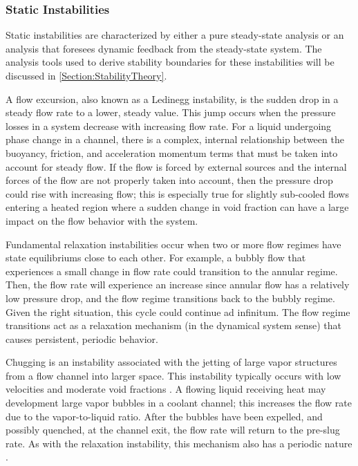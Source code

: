 \subsubsection{Static Instabilities}
Static instabilities are characterized by either a pure steady-state analysis or an analysis that foresees dynamic feedback from the steady-state system.
The analysis tools used to derive stability boundaries for these instabilities will be discussed in \cref{Section:StabilityTheory}.

A flow excursion, also known as a Ledinegg instability, is the sudden drop in a steady flow rate to a lower, steady value.
This jump occurs when the pressure losses in a system decrease with increasing flow rate.
For a liquid undergoing phase change in a channel, there is a complex, internal relationship between the buoyancy, friction, and acceleration momentum terms that must be taken into account for steady flow.
If the flow is forced by external sources and the internal forces of the flow are not properly taken into account, then the pressure drop could rise with increasing flow; this is especially true for slightly sub-cooled flows entering a heated region where a sudden change in void fraction can have a large impact on the flow behavior with the system.

Fundamental relaxation instabilities occur when two or more flow regimes have state equilibriums close to each other.
For example, a bubbly flow that experiences a small change in flow rate could transition to the annular regime.
Then, the flow rate will experience an increase since annular flow has a relatively low pressure drop, and the flow regime transitions back to the bubbly regime.
Given the right situation, this cycle could continue ad infinitum.
The flow regime transitions act as a relaxation mechanism (in the dynamical system sense) that causes persistent, periodic behavior.

Chugging is an instability associated with the jetting of large vapor structures from a flow channel into larger space.
This instability typically occurs with low velocities and moderate void fractions \cite{tong_boiling_1997}.
A flowing liquid receiving heat may development large vapor bubbles in a coolant channel; this increases the flow rate due to the vapor-to-liquid ratio.
After the bubbles have been expelled, and possibly quenched, at the channel exit, the flow rate will return to the pre-slug rate.
As with the relaxation instability, this mechanism also has a periodic nature \cite{aritomi_geysering_1993}.



